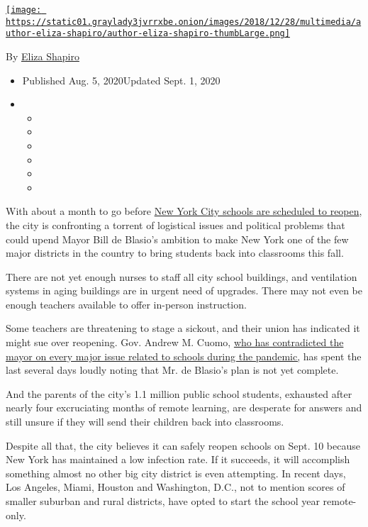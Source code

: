 \href{https://www.nytimes3xbfgragh.onion/by/eliza-shapiro}{\texttt{[image: https://static01.graylady3jvrrxbe.onion/images/2018/12/28/multimedia/author-eliza-shapiro/author-eliza-shapiro-thumbLarge.png]}}

By \href{https://www.nytimes3xbfgragh.onion/by/eliza-shapiro}{Eliza
Shapiro}

\begin{itemize}
\item
  Published Aug. 5, 2020Updated Sept. 1, 2020
\item
  \begin{itemize}
  \item
  \item
  \item
  \item
  \item
  \item
  \end{itemize}
\end{itemize}

With about a month to go before
\href{https://www.nytimes3xbfgragh.onion/2020/09/01/nyregion/schools-open-coronavirus-nyc.html}{New
York City schools are scheduled to reopen}, the city is confronting a
torrent of logistical issues and political problems that could upend
Mayor Bill de Blasio's ambition to make New York one of the few major
districts in the country to bring students back into classrooms this
fall.

There are not yet enough nurses to staff all city school buildings, and
ventilation systems in aging buildings are in urgent need of upgrades.
There may not even be enough teachers available to offer in-person
instruction.

Some teachers are threatening to stage a sickout, and their union has
indicated it might sue over reopening. Gov. Andrew M. Cuomo,
\href{https://www.nytimes3xbfgragh.onion/2020/04/12/nyregion/schools-cuomo-de-blasio-nyc-coronavirus.html}{who
has contradicted the mayor on every major issue related to schools
during the pandemic,} has spent the last several days loudly noting that
Mr. de Blasio's plan is not yet complete.

And the parents of the city's 1.1 million public school students,
exhausted after nearly four excruciating months of remote learning, are
desperate for answers and still unsure if they will send their children
back into classrooms.

Despite all that, the city believes it can safely reopen schools on
Sept. 10 because New York has maintained a low infection rate. If it
succeeds, it will accomplish something almost no other big city district
is even attempting. In recent days, Los Angeles, Miami, Houston and
Washington, D.C., not to mention scores of smaller suburban and rural
districts, have opted to start the school year remote-only.

